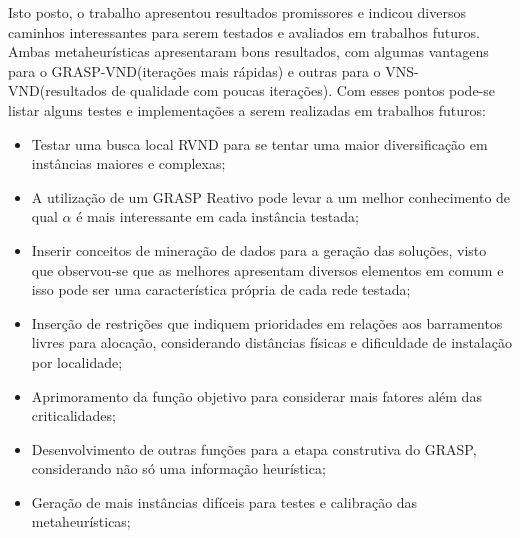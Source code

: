 \documentclass[12pt]{article}
\begin{document}
Isto posto, o trabalho apresentou resultados promissores e indicou diversos caminhos interessantes para serem testados e avaliados em trabalhos futuros. Ambas metaheurísticas apresentaram bons resultados, com algumas vantagens para o GRASP-VND(iterações mais rápidas) e outras para o VNS-VND(resultados de qualidade com poucas iterações). Com esses pontos pode-se listar alguns testes e implementações a serem realizadas em trabalhos futuros:

\begin{itemize}
\item Testar uma busca local RVND para se tentar uma maior diversificação em instâncias maiores e complexas;
\item A utilização de um GRASP Reativo pode levar a um melhor conhecimento de qual $\alpha$ é mais interessante em cada instância testada;
\item Inserir conceitos de mineração de dados para a geração das soluções, visto que observou-se que as melhores apresentam diversos elementos em comum e isso pode ser uma característica própria de cada rede testada;
\item Inserção de restrições que indiquem prioridades em relações aos barramentos livres para alocação, considerando distâncias físicas e dificuldade de instalação por localidade;
\item Aprimoramento da função objetivo para considerar mais fatores além das criticalidades;
\item Desenvolvimento de outras funções para a etapa construtiva do GRASP, considerando não só uma informação heurística;
\item Geração de mais instâncias difíceis para testes e calibração das metaheurísticas;
\end{itemize}
\end{document}
